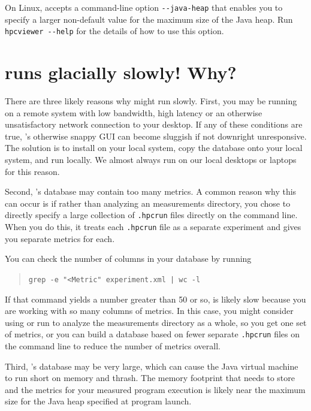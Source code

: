 \documentclass[11pt,letterpaper]{report}
\begin{document}
On Linux, \hpcviewer{} accepts a command-line option \verb|--java-heap| that enables you to specify a larger non-default value for the maximum size of the Java heap. Run \verb|hpcviewer --help| for the details of how to use this option.



\section{\hpcviewer{} runs glacially slowly! Why?}

There are three likely reasons why \hpcviewer{} might run slowly.
First, you may be running \hpcviewer{} on a remote system with low bandwidth, high latency or an otherwise unsatisfactory network connection to your desktop.
If any of these conditions are true, \hpcviewer{}'s otherwise snappy GUI can become sluggish if not downright unresponsive.
The solution is to install \hpcviewer{} on your local system, copy the database onto your local system, and run \hpcviewer{} locally.
We almost always run \hpcviewer{} on our local desktops or laptops for this reason.

Second, \HPCToolkit{}'s database may contain too many metrics.
A common reason why this can occur is if rather than analyzing an \HPCToolkit{}  measurements directory, you chose to directly specify a large collection of {\tt .hpcrun} files directly on the command line. When you do this, it treats each {\tt .hpcrun} file as a separate experiment and gives you separate metrics for each.

You can check the number of columns in your database by running
\begin{quote}
  \verb,grep -e "<Metric" experiment.xml | wc -l,
\end{quote}
If that command yields a number greater than 50 or so, \hpcviewer{} is likely slow because you are working with so many columns of metrics. In this case, you might consider using  \hpcprofmpi{} or run \hpcprof{} to analyze the measurements directory as a whole, so you get one set of metrics, or you can build a database based on fewer separate {\tt .hpcrun} files on the command line to reduce the number of metrics overall.

Third, \HPCToolkit{}'s database may be very large, which can cause the Java virtual machine to run short on memory and thrash. The memory footprint that \hpcviewer{} needs to store and the metrics for your measured program execution is likely near the maximum size for the Java heap specified at program launch.  
\end{document}
